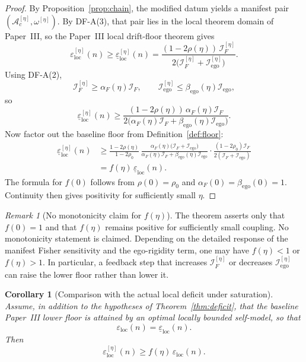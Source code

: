 \documentclass[12pt]{article}
\newtheorem{corollary}[theorem]{Corollary}
\theoremstyle{definition}
\theoremstyle{remark}
\newtheorem{remark}[theorem]{Remark}
\begin{document}
\begin{proof}
By Proposition~\ref{prop:chain}, the modified datum yields a manifest
pair \((\mathcal A_c^{[\eta]},\omega^{[\eta]})\). By DF-A(3), that pair
lies in the local theorem domain of Paper~III, so the Paper~III local
drift-floor theorem gives
\[
\varepsilon_{\mathrm{loc}}^{[\eta]}(n)
\ge
\underline{\varepsilon}_{\mathrm{loc}}^{[\eta]}(n)
=
\frac{(1-2\rho(\eta))\,\mathcal I_F^{[\eta]}}
{2\bigl(\mathcal I_F^{[\eta]}+\mathcal I_{\mathrm{ego}}^{[\eta]}\bigr)}.
\]
Using DF-A(2),
\[
\mathcal I_F^{[\eta]}
\ge
\alpha_F(\eta)\mathcal I_F,
\qquad
\mathcal I_{\mathrm{ego}}^{[\eta]}
\le
\beta_{\mathrm{ego}}(\eta)\mathcal I_{\mathrm{ego}},
\]
so
\[
\underline{\varepsilon}_{\mathrm{loc}}^{[\eta]}(n)
\ge
\frac{(1-2\rho(\eta))\,\alpha_F(\eta)\mathcal I_F}
{2\bigl(\alpha_F(\eta)\mathcal I_F
+\beta_{\mathrm{ego}}(\eta)\mathcal I_{\mathrm{ego}}\bigr)}.
\]
Now factor out the baseline floor from
Definition~\ref{def:floor}:
\begin{align*}
\underline{\varepsilon}_{\mathrm{loc}}^{[\eta]}(n)
&\ge
\frac{1-2\rho(\eta)}{1-2\rho_0}\,
\frac{\alpha_F(\eta)
\bigl(\mathcal I_F+\mathcal I_{\mathrm{ego}}\bigr)}
{\alpha_F(\eta)\mathcal I_F
+\beta_{\mathrm{ego}}(\eta)\mathcal I_{\mathrm{ego}}}
\cdot
\frac{(1-2\rho_0)\mathcal I_F}
{2(\mathcal I_F+\mathcal I_{\mathrm{ego}})} \\
&=
f(\eta)\,
\underline{\varepsilon}_{\mathrm{loc}}(n).
\end{align*}
The formula for \(f(0)\) follows from
\(\rho(0)=\rho_0\) and \(\alpha_F(0)=\beta_{\mathrm{ego}}(0)=1\).
Continuity then gives positivity for sufficiently small \(\eta\).
\end{proof}

\begin{remark}[No monotonicity claim for \(f(\eta)\)]
The theorem asserts only that \(f(0)=1\) and that \(f(\eta)\) remains
positive for sufficiently small coupling. No monotonicity statement is
claimed. Depending on the detailed response of the manifest Fisher
sensitivity and the ego-rigidity term, one may have \(f(\eta)<1\) or
\(f(\eta)>1\). In particular, a feedback step that increases
\(\mathcal I_F^{[\eta]}\) or decreases
\(\mathcal I_{\mathrm{ego}}^{[\eta]}\) can raise the lower floor rather
than lower it.
\end{remark}

\begin{corollary}[Comparison with the actual local deficit under saturation]
\label{cor:saturation}
Assume, in addition to the hypotheses of
Theorem~\ref{thm:deficit}, that the baseline Paper~III lower floor is
attained by an optimal locally bounded self-model, so that
\[
\varepsilon_{\mathrm{loc}}(n)
=
\underline{\varepsilon}_{\mathrm{loc}}(n).
\]
Then
\[
\varepsilon_{\mathrm{loc}}^{[\eta]}(n)
\ge
f(\eta)\,\varepsilon_{\mathrm{loc}}(n).
\]
\end{corollary}
\end{document}
